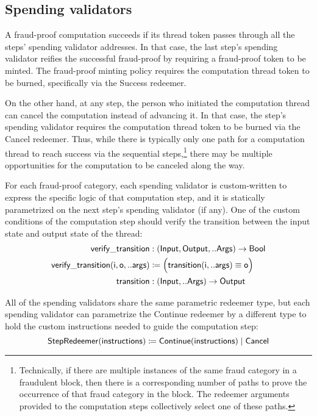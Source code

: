 \documentclass[../midgard.tex]{subfiles}
\begin{document}
\subsection{Spending validators}
\label{h:fraud-proof-computation-threads-spending-validators}

A fraud-proof computation succeeds if its thread token passes through all the steps' spending validator addresses. In that case, the last step's spending validator reifies the successful fraud-proof by requiring a fraud-proof token to be minted. The fraud-proof minting policy requires the computation thread token to be burned, specifically via the Success redeemer.

On the other hand, at any step, the person who initiated the computation thread can cancel the computation instead of advancing it. In that case, the step's spending validator requires the computation thread token to be burned via the Cancel redeemer. Thus, while there is typically only one path for a computation thread to reach success via the sequential steps,\footnote{Technically, if there are multiple instances of the same fraud category in a fraudulent block, then there is a corresponding number of paths to prove the occurrence of that fraud category in the block. The redeemer arguments provided to the computation steps collectively select one of these paths.} there may be multiple opportunities for the computation to be canceled along the way.

For each fraud-proof category, each spending validator is custom-written to express the specific logic of that computation step, and it is statically parametrized on the next step's spending validator (if any). One of the custom conditions of the computation step should verify the transition between the input state and output state of the thread:
\begin{align*}
    \mathsf{verify\_transition} &: (\mathsf{Input}, \mathsf{Output}, ..\mathsf{Args}) -> \mathsf{Bool} \\
    \mathsf{verify\_transition(i, o, ..args)} &\coloneq
        \Bigl( \mathsf{transition(i, ..args) \equiv \mathsf{o}} \Bigr) \\
    \mathsf{transition} &: (\mathsf{Input}, ..\mathsf{Args}) -> \mathsf{Output}
\end{align*}

All of the spending validators share the same parametric redeemer type, but each spending validator can parametrize the Continue redeemer by a different type to hold the custom instructions needed to guide the computation step:
\begin{equation*}
    \mathsf{StepRedeemer} (\mathsf{instructions}) \coloneq
        \mathsf{Continue}(\mathsf{instructions}) \;|\;
        \mathsf{Cancel}
\end{equation*}
\end{document}

